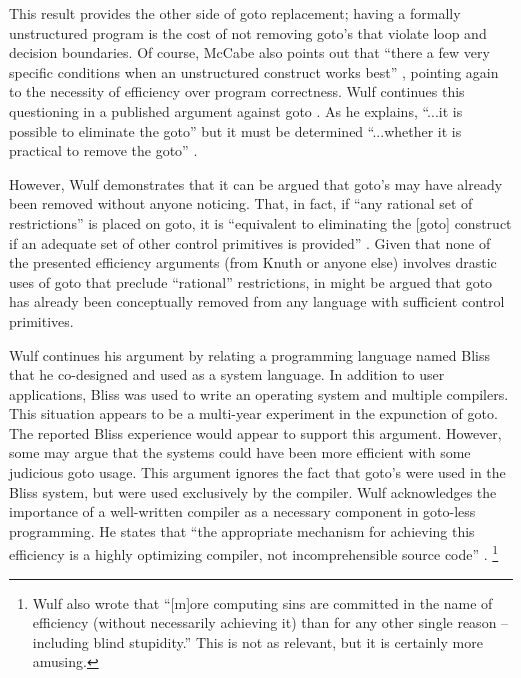 \documentclass[letterpaper,12pt]{article}
\begin{document}
This result provides the other side of goto replacement; having a formally
unstructured program is the cost of not removing goto's that violate loop
and decision boundaries.  Of course, McCabe also points out that ``there a few
very specific conditions when an unstructured construct works best'' \cite{mccabe},
pointing again to the necessity of efficiency over program correctness.
Wulf continues this questioning in a published argument against goto \cite{wulf}.
As he explains,
``...it is possible to eliminate the goto'' but it must be determined
``...whether it is practical to remove the goto'' \cite{wulf}.

However, Wulf demonstrates that it can be argued that goto's may have already
been removed without anyone noticing. That, in fact, if ``any rational
set of restrictions'' is placed on goto, it is ``equivalent to eliminating the [goto]
construct if an adequate set of other control primitives is provided'' \cite{wulf}.
Given that none of the presented efficiency arguments (from Knuth
or anyone else) involves drastic uses of goto that preclude ``rational''
restrictions, in might be argued that goto has already been conceptually
removed from any language with sufficient control primitives.

\label{wulf-bliss-compiler}
Wulf continues his argument by relating a programming language named Bliss that
he co-designed and used as a system language.  In addition to user applications,
Bliss was used to write an operating system and multiple compilers.  This situation
appears to be a multi-year experiment in the expunction of goto.  The
reported Bliss experience would appear to support this argument.  However, some
may argue that the systems could have been more efficient with some judicious
goto usage.  This argument ignores the fact that goto's were
used in the Bliss system, but were used exclusively by the compiler.
Wulf acknowledges the importance of a well-written compiler as a necessary
component in goto-less programming.  He states that ``the appropriate
mechanism for achieving this efficiency is a highly optimizing compiler, not
incomprehensible source code'' \cite{wulf}.
\footnote{Wulf also wrote that ``[m]ore computing sins are committed in the
name of efficiency (without necessarily achieving it) than for any other single
reason -- including blind stupidity.'' \cite{wulf}  This is not as relevant,
but it is certainly more amusing.}


\end{document}

